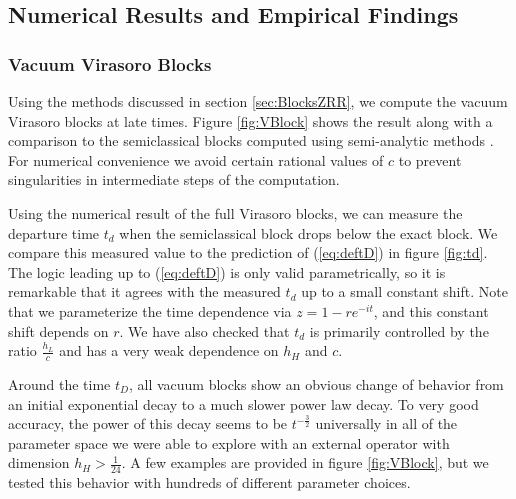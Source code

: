 \documentclass[12pt]{article}
\numberwithin{equation}{section}
\begin{document}
\subsection{Numerical Results and Empirical Findings}

\subsubsection{Vacuum Virasoro Blocks}

Using the methods discussed in section \ref{sec:BlocksZRR}, we compute the vacuum Virasoro blocks at late times. Figure \ref{fig:VBlock} shows the result along with a comparison to the semiclassical blocks computed using semi-analytic methods \cite{Fitzpatrick:2016mjq}.   For numerical convenience we avoid certain rational values of $c$ to prevent singularities in intermediate steps of the computation. 

Using the numerical result of the full Virasoro blocks, we can measure the departure time $t_d$ when the semiclassical block drops below the exact block. We compare this measured value to the prediction of (\ref{eq:deftD}) in figure \ref{fig:td}.  The logic leading up to  (\ref{eq:deftD}) is only valid parametrically, so it is remarkable that it agrees with the measured $t_d$ up to a small constant shift.  Note that we parameterize the time dependence via $z = 1 - r e^{-it}$, and this constant shift depends on $r$.  We have also checked that $t_d$ is primarily controlled by the ratio $\frac{h_L}{c}$ and has a very weak dependence on  $h_H$ and $c$.  

Around the time  $t_D$, all vacuum blocks show an obvious change of behavior from an initial exponential decay to a much slower power law decay.  To very good accuracy, the power of this decay seems to be $t^{-\frac{3}{2}}$ universally in all of the parameter space we were able to explore with an external operator with dimension $h_H>\frac{1}{24}$.  A few examples are provided in figure \ref{fig:VBlock}, but we tested this behavior with hundreds of different parameter choices.
\end{document}
